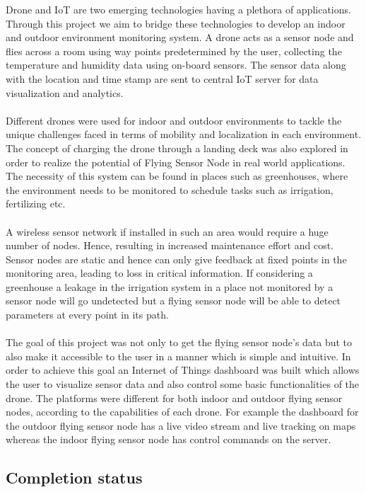 \documentclass[a4paper,12pt,oneside]{book}
\begin{document}
Drone and IoT are two emerging technologies having a plethora of applications. Through this project we aim to bridge these technologies to develop an indoor and outdoor environment monitoring system. A drone acts as a sensor node and flies across a room using way points predetermined by the user, collecting the temperature and humidity data using on-board sensors. The sensor data along with the location and time stamp are sent to central IoT server for data visualization and analytics.\\ \\ 
Different drones were used for indoor and outdoor environments to tackle the unique challenges faced in terms of mobility and localization in each environment. The concept of charging the drone through a landing deck was also explored in order to realize the potential of Flying Sensor Node in real world applications. The necessity of this system can be found in places such as greenhouses, where the environment needs to be monitored to schedule tasks such as irrigation, fertilizing etc. \\ \\
A wireless sensor network if installed in such an area would require a huge number of nodes. Hence, resulting in increased maintenance effort and cost. Sensor nodes are static and hence can only give feedback at fixed points in the monitoring area, leading to loss in critical information. If considering a greenhouse a leakage in the irrigation system in a place not monitored by a sensor node will go undetected but a flying sensor node will be able to detect parameters at every point in its path.\\ \\
The goal of this project was not only to get the flying sensor node's data but to also make it accessible to the user in a manner which is simple and intuitive. In order to achieve this goal an Internet of Things dashboard was built which allows the user to visualize sensor data and also control some basic functionalities of the drone. The platforms were different for both indoor and outdoor flying sensor nodes, according to the capabilities of each drone. For example the dashboard for the outdoor flying sensor node has a live video stream and live tracking on maps whereas the indoor flying sensor node has control commands on the server.

\subsection*{Completion status}
\end{document}
